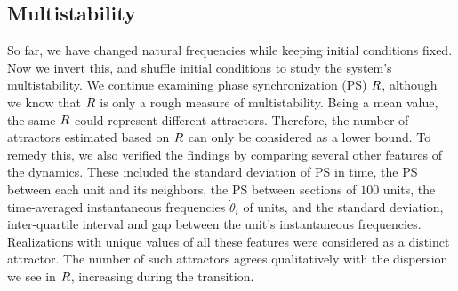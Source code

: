 \subsection{Multistability}
So far, we have changed natural frequencies while keeping initial conditions fixed. Now we invert this, and shuffle initial conditions to study the system's multistability. We continue examining phase synchronization (PS) $R$, although we know that $R$ is only a rough measure of multistability. Being a mean value, the same $R$ could represent different attractors. Therefore, the number of attractors estimated based on $R$ can only be considered as a lower bound. To remedy this, we also verified the findings by comparing several other features of the dynamics. These included the standard deviation of PS in time, the PS between each unit and its neighbors, the PS between sections of $100$ units, the time-averaged instantaneous frequencies $\dot{\theta}_i$ of units, and the standard deviation, inter-quartile interval and gap between the unit's instantaneous frequencies. Realizations with unique values of all these features were considered as a distinct attractor. The number of such attractors agrees qualitatively with the dispersion we see in $R$, increasing during the transition.

